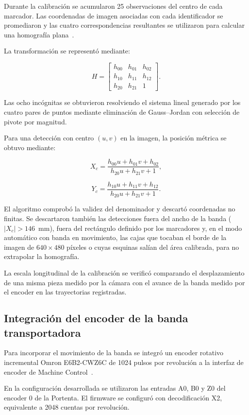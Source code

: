 Durante la calibración se acumularon 25 observaciones del centro de cada marcador. Las coordenadas de imagen asociadas con cada identificador se promediaron y las cuatro correspondencias resultantes se utilizaron para calcular una homografía plana~\cite{hartley2004multiple}.

La transformación se representó mediante:

\[
H=
\begin{bmatrix}
h_{00} & h_{01} & h_{02}\\
h_{10} & h_{11} & h_{12}\\
h_{20} & h_{21} & 1
\end{bmatrix}.
\]

Las ocho incógnitas se obtuvieron resolviendo el sistema lineal generado por los cuatro pares de puntos mediante eliminación de Gauss--Jordan con selección de pivote por magnitud.

Para una detección con centro $(u,v)$ en la imagen, la posición métrica se obtuvo mediante:

\[
X_c=
\frac{h_{00}u+h_{01}v+h_{02}}
{h_{20}u+h_{21}v+1},
\]

\[
Y_c=
\frac{h_{10}u+h_{11}v+h_{12}}
{h_{20}u+h_{21}v+1}.
\]

El algoritmo comprobó la validez del denominador y descartó coordenadas no finitas. Se descartaron también las detecciones fuera del ancho de la banda ($\lvert X_c\rvert>146$~mm), fuera del rectángulo definido por los marcadores y, en el modo automático con banda en movimiento, las cajas que tocaban el borde de la imagen de $640\times480$ píxeles o cuyas esquinas salían del área calibrada, para no extrapolar la homografía.

La escala longitudinal de la calibración se verificó comparando el desplazamiento de una misma pieza medido por la cámara con el avance de la banda medido por el encoder en las trayectorias registradas.


\subsection{Integración del encoder de la banda transportadora}

Para incorporar el movimiento de la banda se integró un encoder rotativo incremental Omron E6B2-CWZ6C de 1024 pulsos por revolución a la interfaz de encoder de Machine Control~\cite{omronEncoder}.

En la configuración desarrollada se utilizaron las entradas A0, B0 y Z0 del encoder 0 de la Portenta. El firmware se configuró con decodificación X2, equivalente a 2048 cuentas por revolución.

